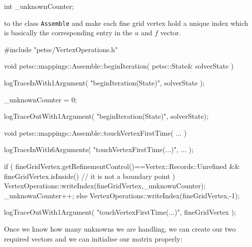 \begin{code}
int  _unknownCounter;
\end{code}

\noindent
to the class \texttt{Assemble} and make each fine grid vertex hold a unique
index which is basically the corresponding entry in the $u$ and $f$ vector.

\begin{code}
#include "petsc/VertexOperations.h"

void petsc::mappings::Assemble::beginIteration(
  petsc::State&  solverState
) {
  logTraceInWith1Argument( "beginIteration(State)", solverState );

  _unknownCounter = 0;

  logTraceOutWith1Argument( "beginIteration(State)", solverState);
}

void petsc::mappings::Assemble::touchVertexFirstTime(
  ...
) {
  logTraceInWith6Arguments( "touchVertexFirstTime(...)", ... );

  if (
    fineGridVertex.getRefinementControl()==Vertex::Records::Unrefined
    &&
    fineGridVertex.isInside() // it is not a boundary point
  ) {
    VertexOperations::writeIndex(fineGridVertex,_unknownCounter);
    _unknownCounter++;
  }
  else {
    VertexOperations::writeIndex(fineGridVertex,-1);
  }

  logTraceOutWith1Argument( "touchVertexFirstTime(...)", fineGridVertex );
}
\end{code}

\noindent
Once we know how many unknowns we are handling, we can create our two required
vectors and we can initialise our matrix properly:


